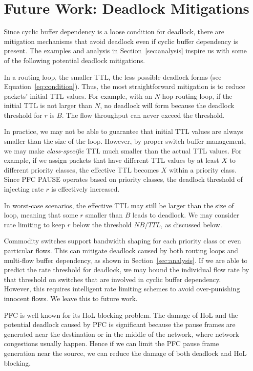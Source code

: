 \section{Future Work: Deadlock Mitigations}
\label{sec:mitigation}

Since cyclic buffer dependency is a loose condition for deadlock, there are
mitigation mechanisms that avoid deadlock even if cyclic buffer dependency is present.
The examples and analysis in Section~\ref{sec:analysis}
inspire us with some of the following potential deadlock mitigations.


 In a routing loop, 
the smaller TTL, the less possible deadlock forms (see Equation~\ref{eq:condition}).
Thus, the most straightforward mitigation is to reduce packets' initial TTL values.
For example, with an $N$-hop routing loop, if the initial TTL is not larger than $N$,
no deadlock will form because the deadlock threshold for $r$ is $B$. The flow throughput
can never exceed the threshold.

In practice, we may not be able to guarantee that initial TTL values are always smaller than
the size of the loop. However, by proper switch buffer management, we may make {\em class-specific}
TTL much smaller than the actual TTL values. For example, if we assign packets 
that have different TTL values by at least $X$ to different priority classes, the effective TTL becomes $X$
within a priority class. Since PFC PAUSE operates based on priority classes, the deadlock threshold
of injecting rate $r$ is effectively increased.

In worst-case scenarios, the effective TTL may still be larger than the size of loop, meaning
that some $r$ smaller than $B$ leads to deadlock. We may consider rate limiting to keep
$r$ below the threshold $NB/TTL$, as discussed below.

 Commodity switches support bandwidth shaping for each priority class
or even particular flows. This can mitigate deadlock caused by both routing loops and multi-flow
buffer dependency, as shown in Section~\ref{sec:analysis}. If we are able to predict the rate 
threshold for deadlock, we may bound the individual flow rate by that threshold on switches 
that are involved in cyclic buffer dependency. However, this requires intelligent rate
limiting schemes to avoid over-punishing innocent flows. We leave this to future work.


PFC is well known for its HoL blocking problem. The damage of HoL and the potential deadlock caused 
by PFC is significant because the pause frames are generated near the destination or in the middle of 
the network, where network congestions usually happen. Hence if we can limit the PFC pause frame 
generation near the source, we can reduce the damage of both deadlock and HoL blocking. 

